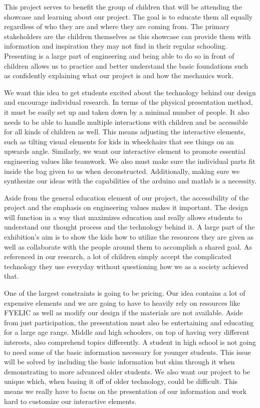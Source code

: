 \documentclass[conference]{IEEEtran}
\begin{document}
\par This project serves to benefit the group of children that will be attending the showcase and learning about our project. The goal is to educate them all equally regardless of who they are and where they are coming from. The primary stakeholders are the children themselves as this showcase can provide them with information and inspiration they may not find in their regular schooling. Presenting is a large part of engineering and being able to do so in front of children allows us to practice and better understand the basic foundations such as confidently explaining what our project is and how the mechanics work.                
\par We want this idea to get students excited about the technology behind our design and encourage individual research. In terms of the physical presentation method, it must be easily set up and taken down by a minimal number of people. It also needs to be able to handle multiple interactions with children and be accessible for all kinds of children as well. This means adjusting the interactive elements, such as tilting visual elements for kids in wheelchairs that see things on an upwards angle. Similarly, we want our interactive element to promote essential engineering values like teamwork. We also must make sure the individual parts fit inside the bag given to us when deconstructed. Additionally, making sure we synthesize our ideas with the capabilities of the arduino and matlab is a necessity.
\par Aside from the general education element of our project, the accessibility of the project and the emphasis on engineering values makes it important. The design will function in a way that maximizes education and really allows students to understand our thought process and the technology behind it. A large part of the exhibition's aim is to show the kids how to utilize the resources they are given as well as collaborate with the people around them to accomplish a shared goal. As referenced in our research, a lot of children simply accept the complicated technology they use everyday without questioning how we as a society achieved that.
\par One of the largest constraints is going to be pricing. Our idea contains a lot of expensive elements and we are going to have to heavily rely on resources like FYELIC as well as modify our design if the materials are not available. Aside from just participation, the presentation must also be entertaining and educating for a large age range. Middle and high schoolers, on top of having very different interests, also comprehend topics differently. A student in high school is not going to need some of the basic information necessary for younger students. This issue will be solved by including the basic information but skim through it when demonstrating to more advanced older students. We also want our project to be unique which, when basing it off of older technology, could be difficult. This means we really have to focus on the presentation of our information and work hard to customize our interactive elements.    
\end{document}
